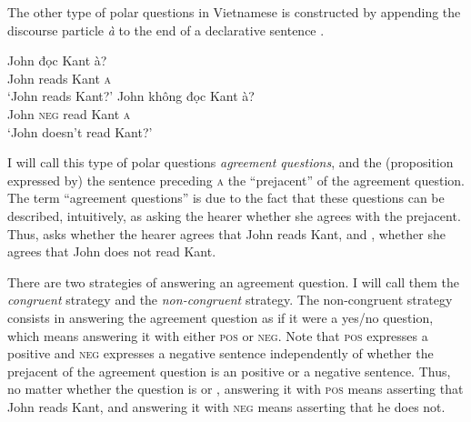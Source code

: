\documentclass[output=paper,colorlinks,citecolor=brown]{langscibook}
\begin{document}

The other type of polar questions in Vietnamese is constructed by appending the discourse particle \textit{à} to the end of a declarative sentence \citep{trinh2010asking}.


\ea
\ea
\gll John đọc Kant à?\\
John reads Kant \textsc{a}\\
\glt `John reads Kant?'\label{agreeread}
\ex
\gll John không đọc Kant à?\\
John \textsc{neg} read Kant \textsc{a}\\
\glt `John doesn't read Kant?'\label{agreenotread}
\z
\z

I will call this type of polar questions \textit{agreement questions}, and the (proposition expressed by) the sentence preceding \textsc{a} the ``prejacent'' of the agreement question. The term ``agreement questions'' is due to the fact that these questions can be described, intuitively, as asking the hearer whether she agrees with the prejacent. Thus,  asks whether the hearer agrees that John reads Kant, and , whether she agrees that John does not read Kant. %

There are two strategies of answering an agreement question. I will call them the \textit{congruent} strategy and the \textit{non-congruent} strategy. The non-congruent strategy consists in answering the agreement question as if it were a yes/no question, which means answering it with either \textsc{pos} or \textsc{neg}. Note that \textsc{pos} expresses a positive and \textsc{neg} expresses a negative sentence independently of whether the prejacent of the agreement question is an positive or a negative sentence. Thus, no matter whether the question is  or , answering it with \textsc{pos} means asserting that John reads Kant, and answering it with \textsc{neg} means asserting that he does not.
\end{document}
